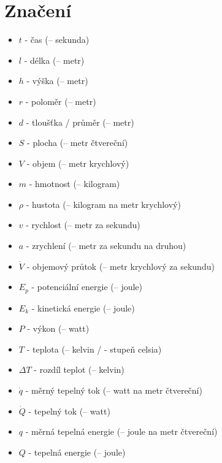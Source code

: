 \documentclass{article}
\begin{document}
\maketitle
\tableofcontents
\newpage



\section{Značení}

\begin{itemize}
    \item $t$ - čas (\ueqS \fs -- sekunda)
    \item $l$ - délka (\ueqM \fs -- metr)
    \item $h$ - výška (\ueqM \fs -- metr)
    \item $r$ - poloměr (\ueqM \fs -- metr)
    \item $d$ - tloušťka / průměr (\ueqM \fs -- metr)
    \item $S$ - plocha (\ueqMsq \fs -- metr čtvereční)
    \item $V$ - objem (\ueqMcu \fs -- metr krychlový)
    \item $m$ - hmotnost (\ueqKG \fs -- kilogram)
    \item $\rho$ - hustota (\ueqKGandMinvcu \fs -- kilogram na metr krychlový)
    \item $v$ - rychlost (\ueqMandSinv \fs -- metr za sekundu)
    \item $a$ - zrychlení (\ueqMandSinvsq \fs -- metr za sekundu na druhou)
    \item $\dot{V}$ - objemový průtok (\ueqMcuSinv \fs -- metr krychlový za sekundu)
    \item $E_p$ - potenciální energie (\ueqJ \fs -- joule)
    \item $E_k$ - kinetická energie (\ueqJ \fs -- joule)
    \item $P$ - výkon (\ueqW \fs -- watt)
    \item $T$ - teplota (\ueqK \fs -- kelvin / \ueqCELS \fs - stupeň celsia)
    \item $\Delta T$ - rozdíl teplot (\ueqK \fs -- kelvin)
    \item $\dot{q}$ - měrný tepelný tok (\ueqWandMinvsq \fs -- watt na metr čtvereční)
    \item $\dot{Q}$ - tepelný tok (\ueqW \fs -- watt)
    \item $q$ - měrná tepelná energie (\ueqJandMinvsq \fs -- joule na metr čtvereční)
    \item $Q$ - tepelná energie (\ueqJ \fs -- joule)

\end{itemize}
\end{document}
